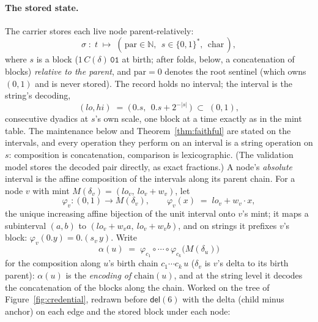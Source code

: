 \documentclass[11pt]{article}
\newcommand{\del}{\mathsf{del}}
\newcommand{\code}[1]{\texttt{#1}}
\newcommand{\chain}{\mathrm{chain}}
\begin{document}
\paragraph{The stored state.} The carrier stores each live node
parent-relatively:
\[
  \sigma \;:\; t \;\mapsto\; (\,\mathrm{par} \in \mathbb{N},\ \
  s \in \{0,1\}^{*},\ \ \mathrm{char}\,),
\]
where $s$ is a block ($1\,C(\delta)\,\code{01}$ at birth; after
folds, below, a concatenation of blocks) \emph{relative to the
parent}, and $\mathrm{par} = 0$ denotes the root sentinel (which
owns $(0,1)$ and is never stored). The record holds no interval; the
interval is the string's decoding,
\[
  (lo, hi) \;=\; \bigl(\,0.s,\ \ 0.s + 2^{-|s|}\,\bigr)
  \;\subset\; (0,1),
\]
consecutive dyadics at $s$'s own scale, one block at a time exactly
as in the mint table. The maintenance below and
Theorem~\ref{thm:faithful} are stated on the intervals, and every
operation they perform on an interval is a string operation on $s$:
composition is concatenation, comparison is lexicographic. (The
validation model stores the decoded pair directly, as exact
fractions.) A node's \emph{absolute} interval is the affine
composition of the intervals along its parent chain. For a node $v$
with mint $M(\delta_v) = (lo_v,\ lo_v + w_v)$, let
\[
  \varphi_v : (0,1) \to M(\delta_v), \qquad
  \varphi_v(x) \;=\; lo_v + w_v \cdot x,
\]
the unique increasing affine bijection of the unit interval onto
$v$'s mint; it maps a subinterval $(a,b)$ to
$(lo_v + w_v a,\ lo_v + w_v b)$, and on strings it prefixes $v$'s
block: $\varphi_v(0.y) = 0.(s_v\, y)$. Write
\[
  \alpha(u) \;=\; \varphi_{c_1} \circ \cdots \circ
  \varphi_{c_k}\bigl(M(\delta_u)\bigr)
\]
for the composition along $u$'s birth chain $c_1 \cdots c_k\,u$
($\delta_v$ is $v$'s delta to its birth parent): $\alpha(u)$ is the
\emph{encoding of $\chain(u)$}, and at the string level it decodes
the concatenation of the blocks along the chain. Worked on the tree
of Figure~\ref{fig:credential}, redrawn before $\del(6)$ with the
delta (child minus anchor) on each edge and the stored block under
each node:
\end{document}
